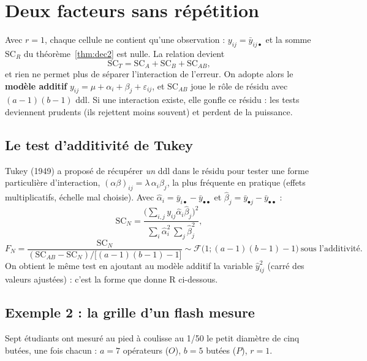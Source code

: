 \documentclass[11pt,a4paper]{article}
\theoremstyle{sj}
\theoremstyle{definition}
\theoremstyle{remark}
\newcommand{\SC}{\mathrm{SC}}
\newcommand{\ybar}{\bar y}
\newcommand{\dotp}{{\scriptscriptstyle\bullet}}
\begin{document}
\section{Deux facteurs sans répétition}\label{sec:sansrep}

Avec $r=1$, chaque cellule ne contient qu'une observation : $y_{ij}=\ybar_{ij\dotp}$ et la somme $\SC_R$ du théorème~\ref{thm:dec2} est nulle. La relation devient
\[
\SC_T=\SC_A+\SC_B+\SC_{AB},
\]
et rien ne permet plus de séparer l'interaction de l'erreur. On adopte alors le \textbf{modèle additif} $y_{ij}=\mu+\alpha_i+\beta_j+\varepsilon_{ij}$, et $\SC_{AB}$ joue le rôle de résidu avec $(a-1)(b-1)$ ddl. Si une interaction existe, elle gonfle ce résidu : les tests deviennent prudents (ils rejettent moins souvent) et perdent de la puissance.

\subsection{Le test d'additivité de Tukey}

Tukey (1949) a proposé de récupérer \emph{un} ddl dans le résidu pour tester une forme particulière d'interaction, $(\alpha\beta)_{ij}=\lambda\,\alpha_i\beta_j$, la plus fréquente en pratique (effets multiplicatifs, échelle mal choisie). Avec $\hat\alpha_i=\ybar_{i\dotp}-\ybar_{\dotp\dotp}$ et $\hat\beta_j=\ybar_{\dotp j}-\ybar_{\dotp\dotp}$ :
\[
\SC_N=\frac{\big(\sum_{i,j}y_{ij}\hat\alpha_i\hat\beta_j\big)^2}{\sum_i\hat\alpha_i^2\,\sum_j\hat\beta_j^2},
\]
\[
F_N=\frac{\SC_N}{(\SC_{AB}-\SC_N)/\big[(a-1)(b-1)-1\big]}\sim\mathcal F\big(1;(a-1)(b-1)-1\big)\ \text{sous l'additivité}.
\]
On obtient le même test en ajoutant au modèle additif la variable $\hat y_{ij}^2$ (carré des valeurs ajustées) : c'est la forme que donne R ci-dessous.

\subsection{Exemple 2 : la grille d'un flash mesure}

Sept étudiants ont mesuré au pied à coulisse au 1/50 le petit diamètre de cinq butées, une fois chacun : $a=7$ opérateurs ($O$), $b=5$ butées ($P$), $r=1$.
\end{document}
